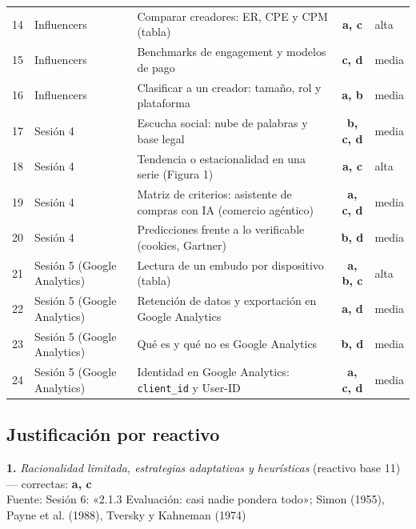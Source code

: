 \documentclass[10pt,letterpaper]{article}
\begin{document}
\begin{center}
\begin{tabular}{@{}rllcl@{}}
14 & Influencers & Comparar creadores: ER, CPE y CPM (tabla) & \textbf{a, c} & alta\\
15 & Influencers & Benchmarks de engagement y modelos de pago & \textbf{c, d} & media\\
16 & Influencers & Clasificar a un creador: tamaño, rol y plataforma & \textbf{a, b} & media\\
17 & Sesión 4 & Escucha social: nube de palabras y base legal & \textbf{b, c, d} & media\\
18 & Sesión 4 & Tendencia o estacionalidad en una serie (Figura 1) & \textbf{a, c} & alta\\
19 & Sesión 4 & Matriz de criterios: asistente de compras con IA (comercio agéntico) & \textbf{a, c, d} & media\\
20 & Sesión 4 & Predicciones frente a lo verificable (cookies, Gartner) & \textbf{b, d} & media\\
21 & Sesión 5 (Google Analytics) & Lectura de un embudo por dispositivo (tabla) & \textbf{a, b, c} & alta\\
22 & Sesión 5 (Google Analytics) & Retención de datos y exportación en Google Analytics & \textbf{a, d} & media\\
23 & Sesión 5 (Google Analytics) & Qué es y qué no es Google Analytics & \textbf{b, d} & media\\
24 & Sesión 5 (Google Analytics) & Identidad en Google Analytics: \texttt{client\_id} y User-ID & \textbf{a, c, d} & media\\
\bottomrule\end{tabular}\end{center}\subsection*{Justificación por reactivo}
\vspace{3pt}\noindent\textbf{1.} \textit{Racionalidad limitada, estrategias adaptativas y heurísticas} (reactivo base 11) — correctas: \textbf{a, c}\\[-1pt]
{\scriptsize Fuente: Sesión 6: «2.1.3 Evaluación: casi nadie pondera todo»; Simon (1955), Payne et al. (1988), Tversky y Kahneman (1974)}
\end{document}
